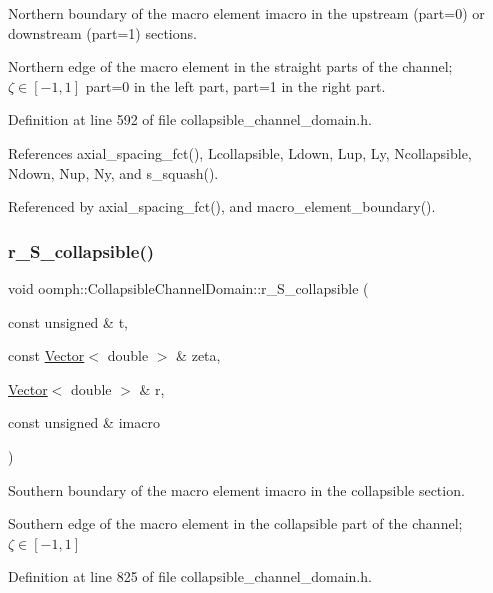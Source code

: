 Northern boundary of the macro element imacro in the upstream (part=0) or downstream (part=1) sections. 

Northern edge of the macro element in the straight parts of the channel; $ \zeta \in [-1,1] $ part=0 in the left part, part=1 in the right part. 

Definition at line 592 of file collapsible\+\_\+channel\+\_\+domain.\+h.



References axial\+\_\+spacing\+\_\+fct(), Lcollapsible, Ldown, Lup, Ly, Ncollapsible, Ndown, Nup, Ny, and s\+\_\+squash().



Referenced by axial\+\_\+spacing\+\_\+fct(), and macro\+\_\+element\+\_\+boundary().

\mbox{\label{classoomph_1_1CollapsibleChannelDomain_a1cc35b555f16401ec12854ff5a486800}} 
\subsubsection{\texorpdfstring{r\+\_\+\+S\+\_\+collapsible()}{r\_S\_collapsible()}}
{\footnotesize\ttfamily void oomph\+::\+Collapsible\+Channel\+Domain\+::r\+\_\+\+S\+\_\+collapsible (\begin{DoxyParamCaption}\item[{const unsigned \&}]{t,  }\item[{const \hyperlink{classoomph_1_1Vector}{Vector}$<$ double $>$ \&}]{zeta,  }\item[{\hyperlink{classoomph_1_1Vector}{Vector}$<$ double $>$ \&}]{r,  }\item[{const unsigned \&}]{imacro }\end{DoxyParamCaption})\hspace{0.3cm}{\ttfamily [private]}}



Southern boundary of the macro element imacro in the collapsible section. 

Southern edge of the macro element in the collapsible part of the channel; $ \zeta \in [-1,1] $ 

Definition at line 825 of file collapsible\+\_\+channel\+\_\+domain.\+h.



